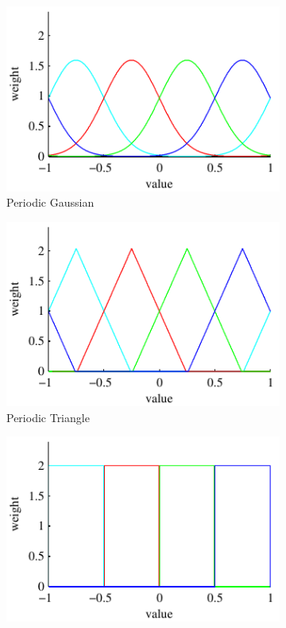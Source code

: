 \documentclass[thesis.tex]{subfiles}
\begin{document}
\begin{figure}
	\centering
	\begin{subfigure}[t]{0.32\textwidth}
		\includegraphics[width=\textwidth]{img/binFilterGaussianPeriodic.pdf}
		\caption{Periodic Gaussian}
		\label{fig:1dFilterGaussianPeriodic}
	\end{subfigure}
	\begin{subfigure}[t]{0.32\textwidth}
		\includegraphics[width=\textwidth]{img/binFilterTrianglePeriodic.pdf}
		\caption{Periodic Triangle}
		\label{fig:1dFilterTrianglePeriodic}
	\end{subfigure}
	\begin{subfigure}[t]{0.32\textwidth}
		\includegraphics[width=\textwidth]{img/binFilterBoxPeriodic.pdf}

\end{subfigure}
\end{figure}
\end{document}
